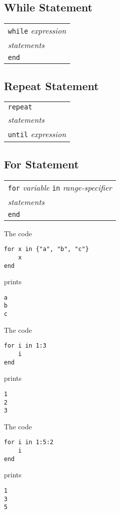 \documentclass{article}
\begin{document}
\subsection{While Statement}
\begin{center}
  \begin{tabular}{l}
    \verb|while| \emph{expression} \\
    \quad\quad \emph{statements} \\
    \verb|end| \\
  \end{tabular}
\end{center}
\subsection{Repeat Statement}
\begin{center}
  \begin{tabular}{l}
    \verb|repeat| \\
    \quad\quad \emph{statements} \\
    \verb|until| \emph{expression} \\
  \end{tabular}
\end{center}
\subsection{For Statement}
\begin{center}
  \begin{tabular}{l}
    \verb|for| \emph{variable} \verb|in| \emph{range-specifier} \\
    \quad\quad \emph{statements} \\
    \verb|end| \\
  \end{tabular}
\end{center}
The code
\begin{verbatim}
for x in {"a", "b", "c"}
    x
end
\end{verbatim}
prints
\begin{verbatim}
a
b
c
\end{verbatim}
The code
\begin{verbatim}
for i in 1:3
    i
end
\end{verbatim}
prints
\begin{verbatim}
1
2
3
\end{verbatim}
The code
\begin{verbatim}
for i in 1:5:2
    i
end
\end{verbatim}
prints
\begin{verbatim}
1
3
5
\end{verbatim}
\end{document}
